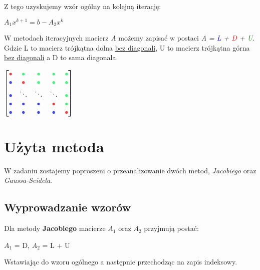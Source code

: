 \documentclass{article}
\begin{document}
  Z tego uzyskujemy wzór ogólny na kolejną iterację:

  \begin{center}
    \large  $A_1x^{k+1} = b - A_2x^{k}$
  \end{center}

  W metodach iteracyjnych macierz \textit{A} możemy zapisać w postaci \textit{A = \textcolor{blue}{L} + \textcolor{red}{D} + \textcolor{green}{U}}. Gdzie L to macierz trójkątna dolna \underline{bez diagonali}, U to macierz trójkątna górna \underline{bez diagonali} a D to sama diagonala.
  \begin{center}
    $\begin{bmatrix}
      \textcolor{red}{\bullet} & \textcolor{green}{\bullet} & \textcolor{green}{\bullet} & \textcolor{green}{\bullet} & \textcolor{green}{\bullet} \\
      \textcolor{blue}{\bullet} & \textcolor{red}{\bullet} & \textcolor{green}{\bullet} & \textcolor{green}{\bullet} & \textcolor{green}{\bullet} \\
      \textcolor{blue}{\bullet} & \ddots & \ddots & \ddots & \textcolor{green}{\bullet} \\
      \textcolor{blue}{\bullet} & \textcolor{blue}{\bullet} & \textcolor{blue}{\bullet} & \textcolor{red}{\bullet} & \textcolor{green}{\bullet} \\
      \textcolor{blue}{\bullet} & \textcolor{blue}{\bullet} & \textcolor{blue}{\bullet} & \textcolor{blue}{\bullet} & \textcolor{red}{\bullet} \\
    \end{bmatrix}$
  \end{center}
    
  \section{Użyta metoda}
  W zadaniu zostajemy poproszeni o przeanalizowanie dwóch metod, \textit{Jacobiego} oraz \textit{Gaussa-Seidela}.
  \subsection{Wyprowadzanie wzorów}
  Dla metody \textbf{Jacobiego} macierze $A_1$ oraz $A_2$ przyjmują postać:

  \begin{center}
    \large  $A_1$ = D, \qquad \qquad $A_2$ = L + U
  \end{center}

  Wstawiając do wzoru ogólnego a następnie przechodząc na zapis indeksowy.
\end{document}
